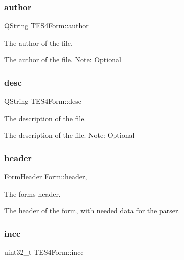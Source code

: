 \subsubsection{\texorpdfstring{author}{author}}
{\footnotesize\ttfamily Q\+String T\+E\+S4\+Form\+::author\hspace{0.3cm}{\ttfamily [protected]}}



The author of the file. 

The author of the file. Note\+: Optional \mbox{\label{class_t_e_s4_form_aa530f6d5b35d9ace03c4f8a0cd56d4ca}} 
\subsubsection{\texorpdfstring{desc}{desc}}
{\footnotesize\ttfamily Q\+String T\+E\+S4\+Form\+::desc\hspace{0.3cm}{\ttfamily [protected]}}



The description of the file. 

The description of the file. Note\+: Optional \mbox{\label{class_form_a6aec4c07386c72bb12947f7766562856}} 
\subsubsection{\texorpdfstring{header}{header}}
{\footnotesize\ttfamily \hyperlink{struct_form_header}{Form\+Header} Form\+::header\hspace{0.3cm}{\ttfamily [protected]}, {\ttfamily [inherited]}}



The form\textquotesingle{}s header. 

The header of the form, with needed data for the parser. \mbox{\label{class_t_e_s4_form_a66402e4e8d8c7ada7380af8c4fd3518c}} 
\subsubsection{\texorpdfstring{incc}{incc}}
{\footnotesize\ttfamily uint32\+\_\+t T\+E\+S4\+Form\+::incc\hspace{0.3cm}{\ttfamily [protected]}}



